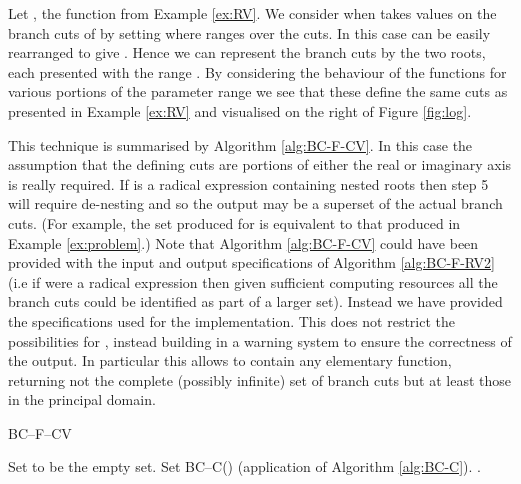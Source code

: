 \documentclass{llncs}
\begin{document}
\begin{example}
\label{ex:CV}
Let , the function from Example \ref{ex:RV}.   We consider when  takes values on the branch cuts of  by setting  where  ranges over the cuts.  In this case  can be easily rearranged to give .  Hence we can represent the branch cuts by the two roots, each presented with the range .  By considering the behaviour of the functions for various portions of the parameter range we see that these define the same cuts as presented in Example \ref{ex:RV} and visualised on the right of Figure \ref{fig:log}.
\end{example}

This technique is summarised by Algorithm \ref{alg:BC-F-CV}.  In this case the 
assumption that the defining cuts are portions of either the real or imaginary axis is really required.   If  is a radical expression containing nested roots then step 5 will require de-nesting and so the output may be a superset of the actual branch cuts.  (For example, the set produced for  is equivalent to that produced in Example \ref{ex:problem}.)  Note that Algorithm \ref{alg:BC-F-CV} could have been provided with the input and output specifications of Algorithm \ref{alg:BC-F-RV2} (i.e if  were a radical expression then given sufficient computing resources all the branch cuts could be identified as part of a larger set).  Instead we have provided the specifications used for the implementation.  This does not restrict the possibilities for , instead building in a warning system to ensure the correctness of the output.  In particular this allows  to contain any elementary function, returning not the complete (possibly infinite) set of branch cuts but at least those in the principal domain.

\begin{algorithm}[ht] \caption{BC--F--CV} \label{alg:BC-F-CV}
\DontPrintSemicolon
{}
\BlankLine
{}
{Set  to be the empty set. \;}
Set BC--C() (application of Algorithm \ref{alg:BC-C}).\;
\Return .
\end{algorithm}
\end{document}
